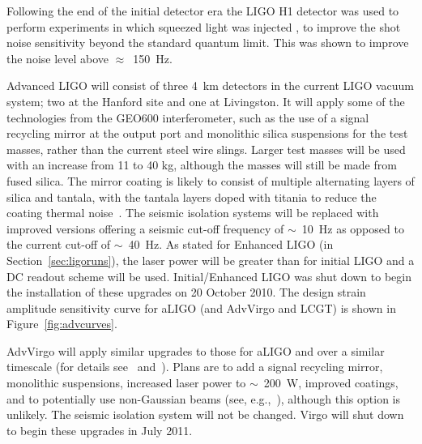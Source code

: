 Following the end of the initial detector era the LIGO H1 detector was used to perform experiments in which 
squeezed light was injected \cite{2013NaPho...7..613A}, to improve the shot noise sensitivity beyond the 
standard quantum limit. This was shown to improve the noise level above $\approx$~150~Hz.

Advanced LIGO will consist of three 4~km detectors in the current LIGO vacuum
system; two at the Hanford site and one at
Livingston. It will apply some of the technologies from the GEO600
interferometer, such as the use of a signal recycling mirror at the output port
and monolithic silica suspensions for the test masses, rather than the current
steel wire slings. Larger test masses will be used with an increase from 11 to
40 kg, although the masses will still be made from fused silica. The mirror
coating is likely to consist of multiple alternating layers of silica and
tantala, with the tantala layers doped with titania to reduce the coating
thermal noise~\cite{Agresti:2006}. The seismic isolation systems will be
replaced with improved versions offering a seismic cut-off frequency
of $\sim$~10~Hz as opposed to the current cut-off of $\sim$~40~Hz. As
stated for Enhanced LIGO (in Section~\ref{sec:ligoruns}), the laser
power will be greater than for initial LIGO and a DC readout scheme
will be used. Initial/Enhanced LIGO was shut down to begin the
installation of these upgrades on 20 October 2010. The design strain
amplitude sensitivity curve for aLIGO (and AdvVirgo and LCGT) is shown
in Figure~\ref{fig:advcurves}.

  
  
  AdvVirgo will apply similar upgrades to those for aLIGO and over a similar
timescale (for details see~\cite{AdvVirgoWhitepaper} and~\cite{AdvVirgoDesign}). Plans are
to add a signal recycling mirror, monolithic suspensions, increased laser power
to $\sim$~200~W, improved coatings, and to potentially use non-Gaussian beams (see,
e.g.,~\cite{Freise:2010}), although this option is unlikely. The seismic isolation
system will not be changed. Virgo will shut down to begin these upgrades in July
2011.


